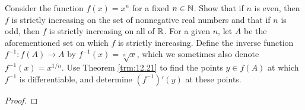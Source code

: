 \documentclass[../main.tex]{subfiles}
\begin{document}
\begin{exercise}\label{exr:12.22}
    Consider the function $f(x)=x^n$ for a fixed $n\in\mathbb{N}$. Show that if $n$ is even, then $f$ is strictly increasing on the set of nonnegative real numbers and that if $n$ is odd, then $f$ is strictly increasing on all of $\mathbb{R}$. For a given $n$, let $A$ be the aforementioned set on which $f$ is strictly increasing. Define the inverse function $f^{-1}:f(A)\to A$ by $f^{-1}(x)=\sqrt[n]{x}$, which we sometimes also denote $f^{-1}(x)=x^{1/n}$. Use Theorem \ref{trm:12.21} to find the points $y\in f(A)$ at which $f^{-1}$ is differentiable, and determine $(f^{-1})'(y)$ at these points.
    \begin{proof}


\end{proof}
\end{exercise}
\end{document}
